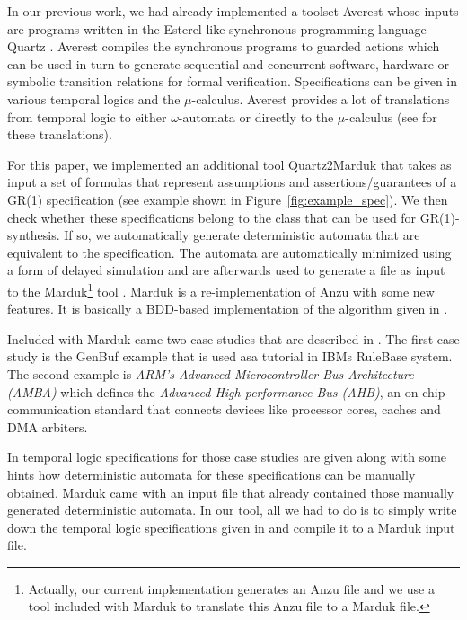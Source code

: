 \documentclass[submission,copyright,creativecommons]{eptcs}
\begin{document}
In our previous work, we had already implemented a toolset Averest \cite{Schn09} whose inputs are programs written in the Esterel-like synchronous programming language Quartz \cite{Schn09}. Averest compiles the synchronous programs to guarded actions which can be used in turn to generate sequential and concurrent software, hardware or symbolic transition relations for formal verification. Specifications can be given in various temporal logics and the $\mu$-calculus. Averest provides a lot of translations from temporal logic to either $\omega$-automata or directly to the $\mu$-calculus (see \cite{Schn03} for these translations).

For this paper, we implemented an additional tool Quartz2Marduk that takes as input a set of \LTL{} formulas that represent assumptions and assertions/guarantees of a GR(1) specification (see example shown in Figure~\ref{fig:example_spec}). We then check whether these specifications belong to the class that can be used for GR(1)-synthesis. If so, we automatically generate deterministic automata that are equivalent to the specification. The automata are automatically minimized using a form of delayed simulation \cite{Frit05b} and are afterwards used to generate a file as input to the Marduk\footnote{Actually, our current implementation generates an Anzu \cite{JGWB07} file and we use a tool included with Marduk to translate this Anzu file to a Marduk file.} tool \cite{BCGH10a}. Marduk is a re-implementation of Anzu \cite{JGWB07} with some new features.
It is basically a BDD-based implementation of the algorithm given in \cite{PiPS06}.

Included with Marduk came two case studies that are described in \cite{BGJP07,BGJP07a,JGWB07}. The first case study is the GenBuf example that is used asa tutorial in IBMs RuleBase system. The second example is \emph{ARM's Advanced Microcontroller Bus Architecture (AMBA)} which defines the \emph{Advanced High performance Bus (AHB)}, an on-chip communication standard that connects devices like processor cores, caches and DMA arbiters.

In \cite{BGJP07,BGJP07a,JGWB07} temporal logic specifications for those case studies are given along with some hints how deterministic automata for these specifications can be manually obtained. Marduk came with an input file that already contained those manually generated deterministic automata. In our tool, all we had to do is to simply write down the temporal logic specifications given in \cite{BGJP07,BGJP07a,JGWB07} and compile it to a Marduk input file.
\end{document}
